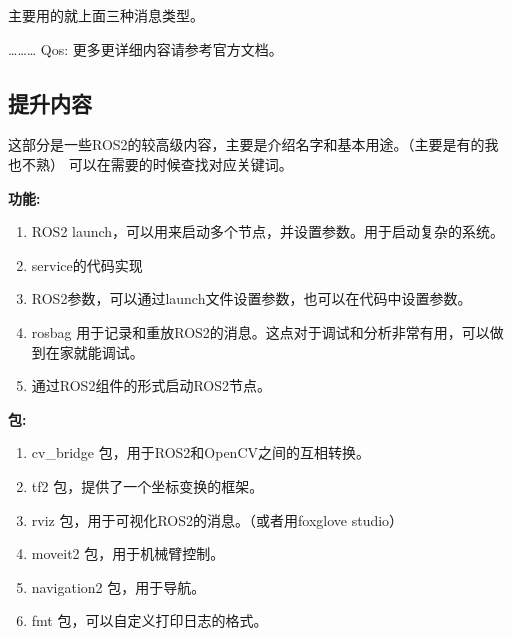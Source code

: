 主要用的就上面三种消息类型。

\dots \dots \dots
Qos: 
更多更详细内容请参考官方文档。

\subsection{提升内容}
这部分是一些ROS2的较高级内容，主要是介绍名字和基本用途。（主要是有的我也不熟）
可以在需要的时候查找对应关键词。

\textbf{功能:}
\begin{enumerate}
    \item ROS2 launch，可以用来启动多个节点，并设置参数。用于启动复杂的系统。
    \item service的代码实现
    \item ROS2参数，可以通过launch文件设置参数，也可以在代码中设置参数。
    \item rosbag 用于记录和重放ROS2的消息。这点对于调试和分析非常有用，可以做到在家就能调试。
    \item 通过ROS2组件的形式启动ROS2节点。
\end{enumerate}

\textbf{包:}
\begin{enumerate}
    \item cv\_bridge 包，用于ROS2和OpenCV之间的互相转换。
    \item tf2 包，提供了一个坐标变换的框架。
    \item rviz 包，用于可视化ROS2的消息。（或者用foxglove studio）
    \item moveit2 包，用于机械臂控制。
    \item navigation2 包，用于导航。
    \item fmt 包，可以自定义打印日志的格式。
\end{enumerate}
